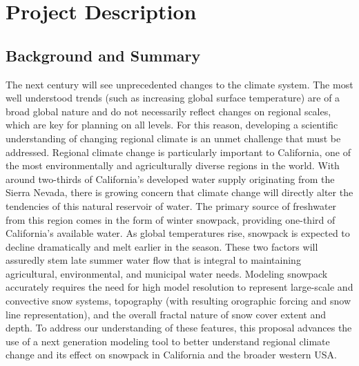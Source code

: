 \documentclass[11pt]{article}
\begin{document}


\section{Project Description}
\subsection{Background and Summary}
The next century will see unprecedented changes to the climate system. The most well understood trends (such as increasing global surface temperature) are of a broad global nature and do not necessarily reflect changes on regional scales, which are key for planning on all levels. For this reason, developing a scientific understanding of changing regional climate is an unmet challenge that must be addressed. Regional climate change is particularly important to California, one of the most environmentally and agriculturally diverse regions in the world. With around two-thirds of California's developed water supply originating from the Sierra Nevada, there is growing concern that climate change will directly alter the tendencies of this natural reservoir of water.  The primary source of freshwater from this region comes in the form of winter snowpack, providing one-third of California's available water.  As global temperatures rise, snowpack is expected to decline dramatically and melt earlier in the season.  These two factors will assuredly stem late summer water flow that is integral to maintaining agricultural, environmental, and municipal water needs.  Modeling snowpack accurately requires the need for high model resolution to represent large-scale and convective snow systems, topography (with resulting orographic forcing and snow line representation), and the overall fractal nature of snow cover extent and depth. To address our understanding of these features, this proposal advances the use of a next generation modeling tool to better understand regional climate change and its effect on snowpack in California and the broader western USA.
\\\\
\end{document}
